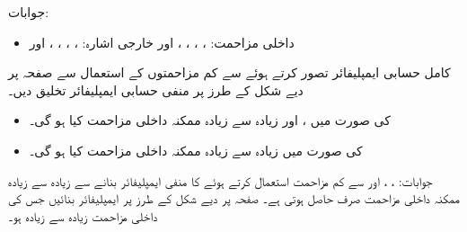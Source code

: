 جوابات:
\begin{itemize}
\item
داخلی مزاحمت: ، ، ، ،  اور  
خارجی اشارہ: ، ، ، ،  اور 
\end{itemize}
 
کامل حسابی ایمپلیفائر تصور کرتے ہوئے  سے کم مزاحمتوں کے استعمال سے  صفحہ  پر دیے شکل  کے طرز پر منفی حسابی ایمپلیفائر تخلیق دیں۔ 
\begin{itemize}
\item
  کی صورت میں ،  اور زیادہ سے زیادہ ممکنہ داخلی مزاحمت کیا ہو گی۔ 
\item
{} کی صورت میں زیادہ سے زیادہ ممکنہ داخلی مزاحمت کیا ہو گی۔ 
\end{itemize}

جوابات: ، ،  اور  
 سے کم مزاحمت استعمال کرتے ہوئے   کا منفی ایمپلیفائر بنانے سے زیادہ سے زیادہ ممکنہ داخلی مزاحمت صرف  حاصل ہوتی ہے۔ صفحہ  پر دیے شکل  کے طرز پر ایمپلیفائر بنائیں جس کی داخلی مزاحمت زیادہ سے زیادہ ہو۔

